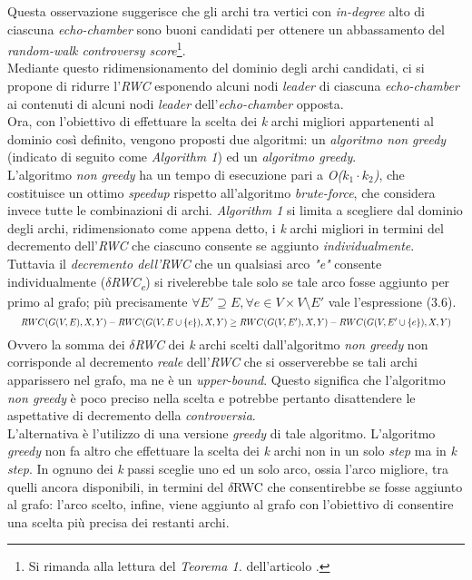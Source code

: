 Questa osservazione suggerisce che gli archi tra vertici con \textit{in-degree} alto di ciascuna \textit{echo-chamber} sono buoni candidati per ottenere un abbassamento del \textit{random-walk controversy score}\footnote{Si rimanda alla lettura del \textit{Teorema 1.} dell'articolo \cite{garimella:paper}.}. 
\\Mediante questo ridimensionamento del dominio degli archi candidati, ci si propone di ridurre l'\textit{RWC} esponendo alcuni nodi \textit{leader} di ciascuna \textit{echo-chamber} ai contenuti di alcuni nodi \textit{leader} dell'\textit{echo-chamber} opposta. 
\\Ora, con l'obiettivo di effettuare la scelta dei \textit{k} archi migliori appartenenti al dominio così definito, vengono proposti due algoritmi: un \textit{algoritmo non greedy} (indicato di seguito come \textit{Algorithm 1}) ed un \textit{algoritmo greedy}.
\\L'algoritmo \textit{non greedy} ha un tempo di esecuzione pari a \textit{O($k_1 \cdot k_2$)}, che costituisce un ottimo \textit{speedup} rispetto all'algoritmo \textit{brute-force}, che considera invece tutte le combinazioni di archi. \textit{Algorithm 1} si limita a scegliere dal dominio degli archi, ridimensionato come appena detto, i \textit{k} archi migliori in termini del decremento dell'\textit{RWC} che ciascuno consente se aggiunto \textit{individualmente}. Tuttavia il \textit{decremento dell'RWC} che un qualsiasi arco \textit{"e"} consente individualmente (\textit{$\delta$RWC\textsubscript{e}}) si rivelerebbe tale solo se tale arco fosse aggiunto per primo al grafo; più precisamente $\forall E' \supseteq E, \forall e \in V \times V \setminus E'$ vale l'espressione (3.6). 
\begin{equation}
\resizebox{1 \textwidth}{!} 
{
    $ RWC(G(V,E),X,Y) - RWC(G(V, E \cup \{e\}),X,Y) \geq RWC(G(V,E'),X,Y) - RWC(G(V, E' \cup \{e\}),X,Y)$
} 
\end{equation}
Ovvero la somma dei \textit{$\delta$RWC} dei \textit{k} archi scelti dall'algoritmo \textit{non greedy} non corrisponde al decremento \textit{reale} dell'\textit{RWC} che si osserverebbe se tali archi apparissero nel grafo, ma ne è un \textit{upper-bound}. Questo significa che l'algoritmo \textit{non greedy} è poco preciso nella scelta e potrebbe pertanto disattendere le aspettative di decremento della \textit{controversia}.
\\L'alternativa è l'utilizzo di una versione \textit{greedy} di tale algoritmo. L'algoritmo \textit{greedy} non fa altro che effettuare la scelta dei \textit{k} archi non in un solo \textit{step} ma in \textit{k step}. In ognuno dei \textit{k} passi sceglie uno ed un solo arco, ossia l'arco migliore, tra quelli ancora disponibili, in termini del $\delta$RWC che consentirebbe se fosse aggiunto al grafo: l'arco scelto, infine, viene aggiunto al grafo con l'obiettivo di consentire una scelta più precisa dei restanti archi.
